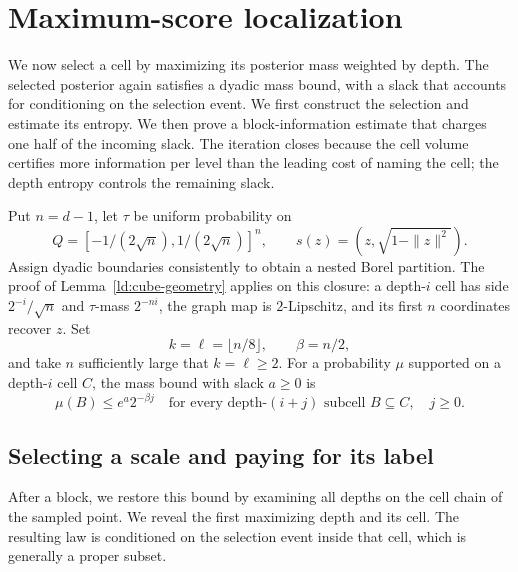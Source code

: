 \section{Maximum-score localization}
\label{l:maxscore:section}

We now select a cell by maximizing its posterior mass weighted by
depth. The selected posterior again satisfies a dyadic mass bound,
with a slack that accounts for conditioning on the selection event.
We first construct the selection and estimate its entropy. We then
prove a block-information estimate that charges one half of the
incoming slack. The iteration closes because the cell volume certifies
more information per level than the leading cost of naming the cell;
the depth entropy controls the remaining slack.

Put \(n=d-1\), let \(\tau\) be uniform probability on
\[
 Q=[-1/(2\sqrt n),1/(2\sqrt n)]^n,\qquad
 s(z)=(z,\sqrt{1-\|z\|^2}).
\]
Assign dyadic boundaries consistently to obtain a nested Borel
partition.  The proof of Lemma~\ref{ld:cube-geometry} applies on this
closure: a depth-\(i\) cell has side \(2^{-i}/\sqrt n\) and
\(\tau\)-mass \(2^{-ni}\), the graph map is \(2\)-Lipschitz, and
its first \(n\) coordinates recover \(z\).
Set
\[
 k=\ell=\lfloor n/8\rfloor,\qquad \beta=n/2,
\]
and take \(n\) sufficiently large that \(k=\ell\ge2\).
For a probability \(\mu\) supported on a depth-\(i\) cell \(C\),
the mass bound with slack \(a\ge0\) is
\begin{equation}\label{l:maxscore:spread}
 \mu(B)\le e^a2^{-\beta j}
 \quad\text{for every depth-\((i+j)\) subcell }B\subseteq C,
 \quad j\ge0.
\end{equation}

\subsection{Selecting a scale and paying for its label}

After a block, we restore this bound by examining all depths on the
cell chain of the sampled point. We reveal the first maximizing
depth and its cell. The resulting law is conditioned on the
selection event inside that cell, which is generally a proper subset.

